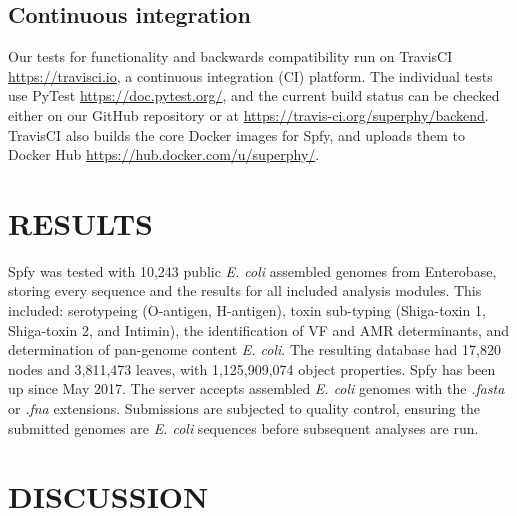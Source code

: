 \documentclass{article}
\begin{document}
\subsection{Continuous integration}

Our tests for functionality and backwards compatibility run on TravisCI \url{https://travisci.io}, a continuous integration (CI) platform.
The individual tests use PyTest \url{https://doc.pytest.org/}, and the current build status can be checked either on our GitHub repository or at \url{https://travis-ci.org/superphy/backend}.
TravisCI also builds the core Docker images for Spfy, and uploads them to Docker Hub \url{https://hub.docker.com/u/superphy/}.

\section{RESULTS}
Spfy was tested with 10,243 public \textit{E. coli} assembled genomes from Enterobase, storing every sequence and the results for all included analysis modules. This included: serotypeing (O-antigen, H-antigen), toxin sub-typing (Shiga-toxin 1, Shiga-toxin 2, and Intimin), the identification of VF and AMR determinants, and determination of pan-genome content \textit{E. coli}.
The resulting database had 17,820 nodes and 3,811,473 leaves, with 1,125,909,074 object properties.
Spfy has been up since May 2017. The server accepts assembled \textit{E. coli} genomes with the \textit{.fasta} or \textit{.fna} extensions. Submissions are subjected to quality control, ensuring the submitted genomes are \textit{E. coli} sequences before subsequent analyses are run.
\par

\small 




\section{DISCUSSION}
\end{document}
